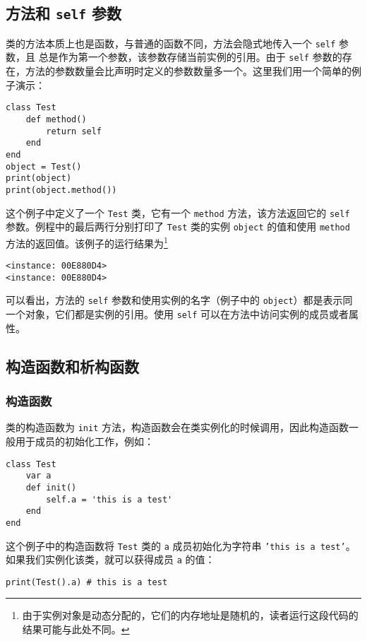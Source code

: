 \subsection{方法和 \texttt{self} 参数}

类的方法本质上也是函数，与普通的函数不同，方法会隐式地传入一个 \texttt{self} 参数，且  总是作为第一个参数，该参数存储当前实例的引用。由于 \texttt{self} 参数的存在，方法的参数数量会比声明时定义的参数数量多一个。这里我们用一个简单的例子演示：
\begin{lstlisting}[language=berry, numbers=none]
class Test
    def method()
        return self
    end
end
object = Test()
print(object)
print(object.method())
\end{lstlisting}
这个例子中定义了一个 \texttt{Test} 类，它有一个 \texttt{method} 方法，该方法返回它的 \texttt{self} 参数。例程中的最后两行分别打印了 \texttt{Test} 类的实例 \texttt{object} 的值和使用 \texttt{method} 方法的返回值。该例子的运行结果为\footnote{由于实例对象是动态分配的，它们的内存地址是随机的，读者运行这段代码的结果可能与此处不同。}
\begin{lstlisting}[numbers=none]
<instance: 00E880D4>
<instance: 00E880D4>
\end{lstlisting}
可以看出，方法的 \texttt{self} 参数和使用实例的名字（例子中的 \texttt{object}）都是表示同一个对象，它们都是实例的引用。使用 \texttt{self} 可以在方法中访问实例的成员或者属性。

\subsection{构造函数和析构函数}

\subsubsection{构造函数}

类的构造函数为 \texttt{init} 方法，构造函数会在类实例化的时候调用，因此构造函数一般用于成员的初始化工作，例如：
\begin{lstlisting}[language=berry, numbers=none]
class Test
    var a
    def init()
        self.a = 'this is a test'
    end
end
\end{lstlisting}
这个例子中的构造函数将 \texttt{Test} 类的 \texttt{a} 成员初始化为字符串 \texttt{'this is a test'}。如果我们实例化该类，就可以获得成员 \texttt{a} 的值：
\begin{lstlisting}[language=berry, numbers=none]
print(Test().a) # this is a test
\end{lstlisting}

